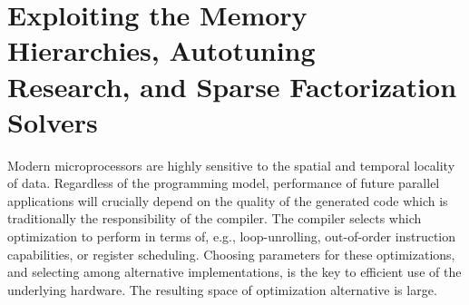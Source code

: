 %
%
%

\section[Memory Hierarchies, Autotuning, and Solvers]{Exploiting the Memory Hierarchies, Autotuning\\ Research, and Sparse Factorization Solvers}
\label{sec:modeling-intro}

Modern microprocessors are highly sensitive to the spatial and temporal locality of data. Regardless of the programming model, performance of future parallel applications will crucially depend on the quality of the generated code which is traditionally the responsibility of the compiler. The compiler selects which optimization to perform in terms of, e.g., loop-unrolling, out-of-order instruction capabilities, or register scheduling. Choosing parameters for these optimizations, and selecting among alternative implementations, is the key to efficient use of the underlying hardware. The resulting space of optimization alternative is large.

